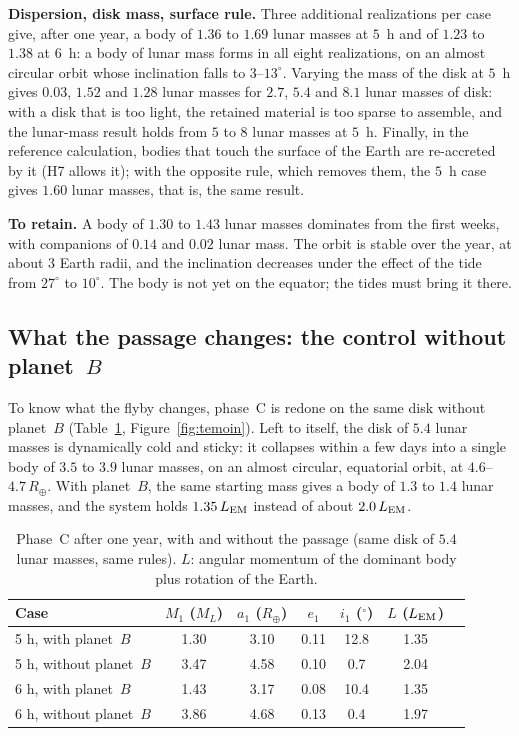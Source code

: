 \documentclass[11pt,a4paper]{article}
\newcommand{\Rt}{\ensuremath{R_\oplus}}
\newcommand{\ML}{\ensuremath{M_L}}
\newcommand{\LEM}{\ensuremath{L_{\rm EM}}}
\begin{document}
\textbf{Dispersion, disk mass, surface rule.} Three additional realizations per case give, after one year, a body of $1.36$ to $1.69$ lunar masses at $5$~h and of $1.23$ to $1.38$ at $6$~h: a body of lunar mass forms in all eight realizations, on an almost circular orbit whose inclination falls to $3$--$13^\circ$. Varying the mass of the disk at $5$~h gives $0.03$, $1.52$ and $1.28$ lunar masses for $2.7$, $5.4$ and $8.1$ lunar masses of disk: with a disk that is too light, the retained material is too sparse to assemble, and the lunar-mass result holds from $5$ to $8$ lunar masses at $5$~h. Finally, in the reference calculation, bodies that touch the surface of the Earth are re-accreted by it (H7 allows it); with the opposite rule, which removes them, the $5$~h case gives $1.60$ lunar masses, that is, the same result.

\textbf{To retain.} A body of $1.30$ to $1.43$ lunar masses dominates from the first weeks, with companions of $0.14$ and $0.02$ lunar mass. The orbit is stable over the year, at about $3$ Earth radii, and the inclination decreases under the effect of the tide from $27^\circ$ to $10^\circ$. The body is not yet on the equator; the tides must bring it there.

\subsection{What the passage changes: the control without planet~$B$}
\label{sec:control}

To know what the flyby changes, phase~C is redone on the same disk without planet~$B$ (Table~\ref{tab:control}, Figure~\ref{fig:temoin}). Left to itself, the disk of $5.4$ lunar masses is dynamically cold and sticky: it collapses within a few days into a single body of $3.5$ to $3.9$ lunar masses, on an almost circular, equatorial orbit, at $4.6$--$4.7\,\Rt$. With planet~$B$, the same starting mass gives a body of $1.3$ to $1.4$ lunar masses, and the system holds $1.35\,\LEM$ instead of about $2.0\,\LEM$.

\begin{table}[htbp]
\centering
\caption{Phase~C after one year, with and without the passage (same disk of $5.4$ lunar masses, same rules). $L$: angular momentum of the dominant body plus rotation of the Earth.\label{tab:control}}
\small
\begin{tabular}{lcccccc}
\toprule
Case & $M_1$ ($\ML$) & $a_1$ ($\Rt$) & $e_1$ & $i_1$ ($^\circ$) & $L$ ($\LEM$) \\
\midrule
5 h, with planet~$B$ & 1.30 & 3.10 & 0.11 & 12.8 & 1.35 \\
5 h, without planet~$B$ & 3.47 & 4.58 & 0.10 & 0.7 & 2.04 \\
6 h, with planet~$B$ & 1.43 & 3.17 & 0.08 & 10.4 & 1.35 \\
6 h, without planet~$B$ & 3.86 & 4.68 & 0.13 & 0.4 & 1.97 \\
\bottomrule
\end{tabular}
\end{table}
\end{document}
